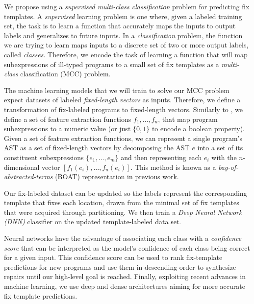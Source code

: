 We propose using a \emph{supervised multi-class classification} problem for
predicting fix templates. A \emph{supervised} learning problem is one where,
given a labeled training set, the task is to learn a function that accurately
maps the inputs to output labels and generalizes to future inputs. In a
\emph{classification} problem, the function we are trying to learn maps inputs
to a discrete set of two or more output labels, called \emph{classes}.
Therefore, we encode the task of learning a function that will map
subexpressions of ill-typed programs to a small set of fix templates as a
\emph{multi-class} classification (MCC) problem.

 The machine learning models that we will train
to solve our MCC problem expect datasets of labeled \emph{fixed-length vectors}
as inputs. Therefore, we define a transformation of fix-labeled programs to
fixed-length vectors. Similarly to \citep{Seidel:2017}, we define a set of
feature extraction functions $f_1, \ldots, f_n$, that map program subexpressions
to a numeric value (or just $\{0, 1\}$ to encode a boolean property). Given a
set of feature extraction functions, we can represent a single program's AST as
a set of fixed-length vectors by decomposing the AST $e$ into a set of its
constituent subexpressions $\{e_1, \ldots, e_m\}$ and then representing each
$e_i$ with the $n$-dimensional vector $[f_1(e_i), \ldots, f_n(e_i)]$. This
method is known as a \emph{bag-of-abstracted-terms} (BOAT) representation in
previous work.

Our fix-labeled dataset can be updated so the labels represent the corresponding
template that fixes each location, drawn from the minimal set of fix templates
that were acquired through partitioning. We then train a \emph{Deep Neural
Network (DNN)} classifier on the updated template-labeled data set.

Neural networks have the advantage of associating each class with a
\emph{confidence score} that can be interpreted as the model's confidence of
each class being correct for a given input. This confidence score can be used to
rank fix-template predictions for new programs and use them in descending order
to synthesize repairs until our high-level goal is reached. Finally, exploiting
recent advances in machine learning, we use deep and dense architectures
\citep{Schmidhuber_2015} aiming for more accurate fix template predictions.

